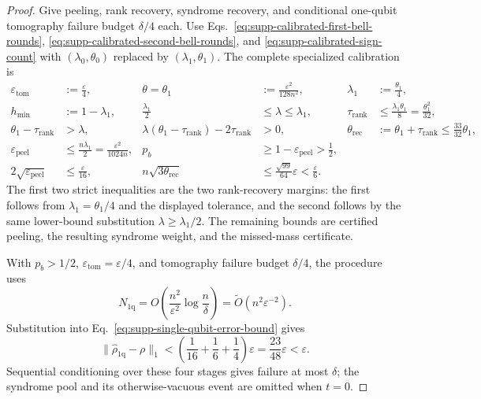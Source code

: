 \documentclass[
  aps,
  prx,
  reprint,
  superscriptaddress,
  amsmath,
  amssymb,
  nofootinbib,
  longbibliography
]{revtex4-2}
\begin{document}
\begin{proof}
Give peeling, rank recovery, syndrome recovery, and conditional one-qubit
tomography failure budget $\delta/4$ each.  Use
Eqs.~\eqref{eq:supp-calibrated-first-bell-rounds},
\eqref{eq:supp-calibrated-second-bell-rounds}, and
\eqref{eq:supp-calibrated-sign-count} with $(\lambda_0,\theta_0)$ replaced
by $(\lambda_1,\theta_1)$.  The complete specialized calibration is
\begin{equation}
\begin{aligned}
\varepsilon_{\mathrm{tom}}&:=\frac{\varepsilon}{4},
&
\theta=\theta_1&:=\frac{\varepsilon^2}{128n^2},
&
\lambda_1&:=\frac{\theta_1}{4},
\\
h_{\min}&:=1-\lambda_1,
&
\frac{\lambda_1}{2}&\le\lambda\le\lambda_1,
&
\tau_{\mathrm{rank}}&\le\frac{\lambda_1\theta_1}{8}
=\frac{\theta_1^2}{32},
\\
\theta_1-\tau_{\mathrm{rank}}&>\lambda,
&
\lambda(\theta_1-\tau_{\mathrm{rank}})-2\tau_{\mathrm{rank}}&>0,
&
\theta_{\mathrm{rec}}&:=\theta_1+\tau_{\mathrm{rank}}
\le\frac{33}{32}\theta_1,
\\
\varepsilon_{\mathrm{peel}}
&\le\frac{n\lambda_1}{2}
=\frac{\varepsilon^2}{1024n},
&
p_b&\ge1-\varepsilon_{\mathrm{peel}}>\frac12,
\\
2\sqrt{\varepsilon_{\mathrm{peel}}}&\le\frac{\varepsilon}{16},
&
n\sqrt{3\theta_{\mathrm{rec}}}
&\le\frac{\sqrt{99}}{64}\varepsilon<\frac{\varepsilon}{6}.
\end{aligned}
\end{equation}
The first two strict inequalities are the two rank-recovery margins: the
first follows from $\lambda_1=\theta_1/4$ and the displayed tolerance, and
the second follows by the same lower-bound substitution
$\lambda\ge\lambda_1/2$.  The remaining bounds are certified peeling,
the resulting syndrome weight, and the missed-mass certificate.

With \(p_b>1/2\), \(\varepsilon_{\mathrm{tom}}=\varepsilon/4\), and tomography
failure budget \(\delta/4\), the procedure uses
\begin{equation}
N_{1\mathrm q}=O\!\left(
\frac{n^2}{\varepsilon^2}\log\frac{n}{\delta}\right)
=
\widetilde O(n^2\varepsilon^{-2}).
\end{equation}
Substitution into Eq.~\eqref{eq:supp-single-qubit-error-bound} gives
\begin{equation}
\|\widehat\rho_{1\mathrm q}-\rho\|_1
<\left(\frac1{16}+\frac16+\frac14\right)\varepsilon
=\frac{23}{48}\varepsilon<\varepsilon.
\end{equation}
Sequential conditioning over these four stages gives failure at most
\(\delta\); the syndrome pool and its otherwise-vacuous event are omitted
when $t=0$.


\end{proof}
\end{document}
